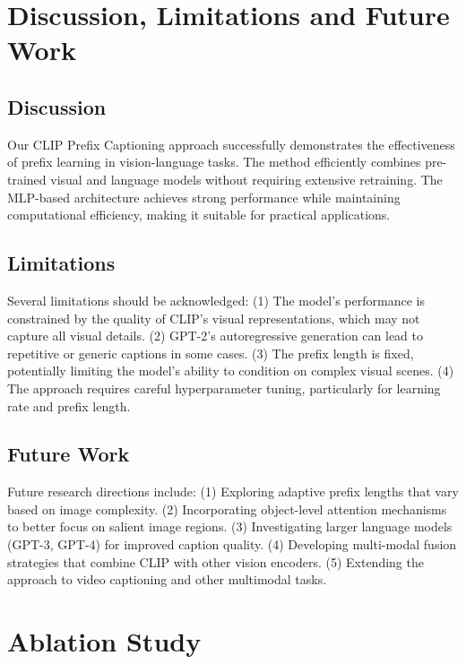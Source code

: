 \documentclass[runningheads]{llncs}
\begin{document}
\section{Discussion, Limitations and Future Work}

\subsection{Discussion}

Our CLIP Prefix Captioning approach successfully demonstrates the effectiveness of prefix learning in vision-language tasks. The method efficiently combines pre-trained visual and language models without requiring extensive retraining. The MLP-based architecture achieves strong performance while maintaining computational efficiency, making it suitable for practical applications.

\subsection{Limitations}

Several limitations should be acknowledged: (1) The model's performance is constrained by the quality of CLIP's visual representations, which may not capture all visual details. (2) GPT-2's autoregressive generation can lead to repetitive or generic captions in some cases. (3) The prefix length is fixed, potentially limiting the model's ability to condition on complex visual scenes. (4) The approach requires careful hyperparameter tuning, particularly for learning rate and prefix length.

\subsection{Future Work}

Future research directions include: (1) Exploring adaptive prefix lengths that vary based on image complexity. (2) Incorporating object-level attention mechanisms to better focus on salient image regions. (3) Investigating larger language models (GPT-3, GPT-4) for improved caption quality. (4) Developing multi-modal fusion strategies that combine CLIP with other vision encoders. (5) Extending the approach to video captioning and other multimodal tasks.

\section{Ablation Study}
\end{document}
